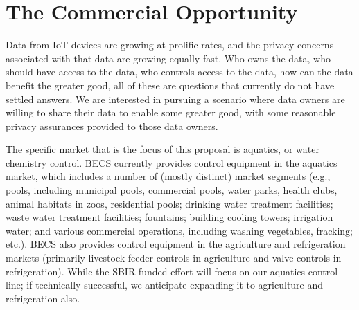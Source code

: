 \section{The Commercial Opportunity}
\label{sec:opportunity}

%

Data from IoT devices are growing at prolific rates, and the privacy concerns
associated with that data are growing equally fast.  Who owns the data, who
should have access to the data, who controls access to the data, how can
the data benefit the greater good, all of these are questions that currently
do not have settled answers.  We are interested in pursuing a scenario
where data owners are willing to share their data to enable some greater
good, with some reasonable privacy assurances provided to those data owners.

The specific market that is the focus of this proposal is aquatics, or
water chemistry control. BECS currently provides control equipment in
the aquatics market, which includes a number of (mostly distinct)
market segments (e.g., pools, including municipal pools, commercial
pools, water parks, health clubs, animal habitats in zoos, residential pools;
drinking water treatment facilities; waste water treatment facilities;
fountains; building cooling towers; irrigation water; and
various commercial operations, including washing vegetables, fracking; etc.).
BECS also provides control equipment in the
agriculture and refrigeration markets (primarily livestock feeder controls
in agriculture and valve controls in refrigeration).
While the SBIR-funded effort will focus on our aquatics control line;
if technically successful, we anticipate expanding it to agriculture
and refrigeration also.

